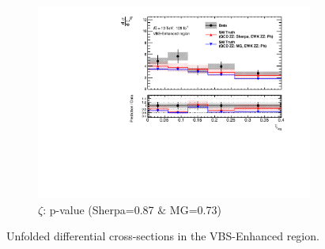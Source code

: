 \begin{figure}[!htb]
\begin{subfigure}{.49\textwidth}
        \includegraphics[width=.98\linewidth]{figures/Results/CrossSection_VBSEnhanced/xs_centrality_SR.pdf}
        \caption{ \footnotesize{$\zeta$: p-value (Sherpa=0.87 $\&$ MG=0.73)} }
    \end{subfigure}
    \caption{Unfolded differential cross-sections in the VBS-Enhanced region.}  \label{fig:unfolded_xs_VBS_Enhanced_b}
\end{figure}